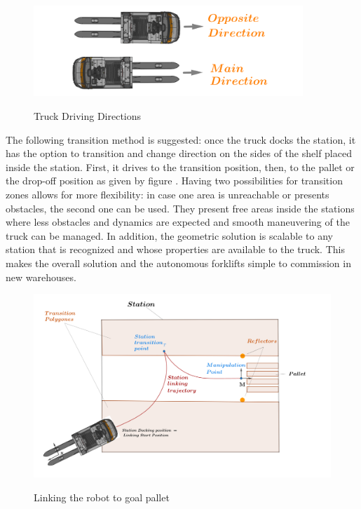 \begin{figure}
    [!ht]
    \begin{center}
    \includegraphics[width=4in]{images/Chap2/driving_directions.png}\\
    \caption{Truck Driving Directions}
    \label{driving directions}
    \end{center}
\end{figure} 
 
The following transition method is suggested: once the truck docks the station, it has the option to transition and change 
direction on the sides of the shelf placed inside the station. First, it drives to the transition position, then, to the 
pallet or the drop-off position as given by figure . Having two possibilities for transition zones allows 
for more flexibility: 
in case one area is unreachable or presents obstacles, the second one can be used. They present free areas 
inside the stations where less obstacles and dynamics are expected and smooth maneuvering of the truck can be managed. 
In addition, the geometric solution is scalable to 
any station that is recognized and whose properties are available to the truck. This makes the overall solution and the 
autonomous forklifts simple to
commission in new warehouses.

\begin{figure}
    [!ht]
    \begin{center}
    \includegraphics[width=\linewidth]{images/Chap2/station-without-subpolygones (2).png}\\
    \caption{Linking the robot to goal pallet \cite{R28}}
    \label{subpolygons}
    \end{center}
\end{figure}

